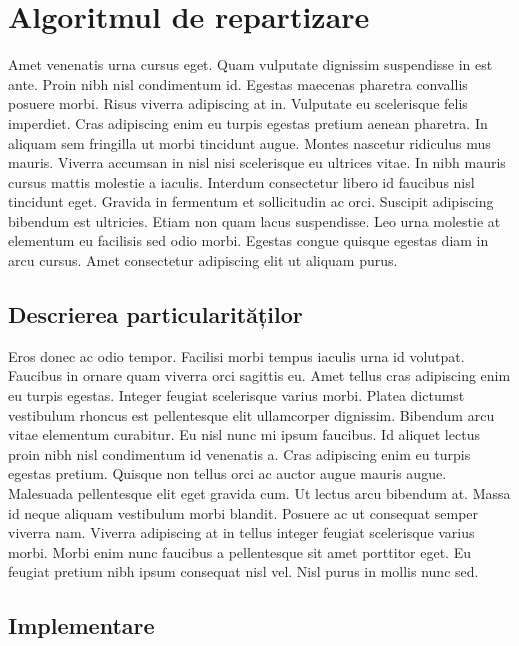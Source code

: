 \chapter{Algoritmul de repartizare}

Amet venenatis urna cursus eget. Quam vulputate dignissim suspendisse in est ante. Proin nibh nisl condimentum id. Egestas maecenas pharetra convallis posuere morbi. Risus viverra adipiscing at in. Vulputate eu scelerisque felis imperdiet. Cras adipiscing enim eu turpis egestas pretium aenean pharetra. In aliquam sem fringilla ut morbi tincidunt augue. Montes nascetur ridiculus mus mauris. Viverra accumsan in nisl nisi scelerisque eu ultrices vitae. In nibh mauris cursus mattis molestie a iaculis. Interdum consectetur libero id faucibus nisl tincidunt eget. Gravida in fermentum et sollicitudin ac orci. Suscipit adipiscing bibendum est ultricies. Etiam non quam lacus suspendisse. Leo urna molestie at elementum eu facilisis sed odio morbi. Egestas congue quisque egestas diam in arcu cursus. Amet consectetur adipiscing elit ut aliquam purus.

\section{Descrierea particularităților}

Eros donec ac odio tempor. Facilisi morbi tempus iaculis urna id volutpat. Faucibus in ornare quam viverra orci sagittis eu. Amet tellus cras adipiscing enim eu turpis egestas. Integer feugiat scelerisque varius morbi. Platea dictumst vestibulum rhoncus est pellentesque elit ullamcorper dignissim. Bibendum arcu vitae elementum curabitur. Eu nisl nunc mi ipsum faucibus. Id aliquet lectus proin nibh nisl condimentum id venenatis a. Cras adipiscing enim eu turpis egestas pretium. Quisque non tellus orci ac auctor augue mauris augue. Malesuada pellentesque elit eget gravida cum. Ut lectus arcu bibendum at. Massa id neque aliquam vestibulum morbi blandit. Posuere ac ut consequat semper viverra nam. Viverra adipiscing at in tellus integer feugiat scelerisque varius morbi. Morbi enim nunc faucibus a pellentesque sit amet porttitor eget. Eu feugiat pretium nibh ipsum consequat nisl vel. Nisl purus in mollis nunc sed.

\section{Implementare}

